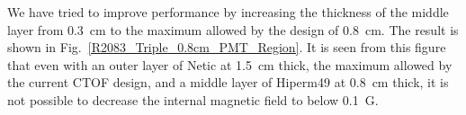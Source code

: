 \documentclass[12pt]{article}
\begin{document}
We have tried to  improve  performance  by increasing the thickness 
of the middle layer  from 0.3~cm to the maximum allowed by the design 
of 0.8~cm. The result is shown in  Fig.~\ref{R2083_Triple_0.8cm_PMT_Region}.  It is seen from this figure 
that even with an outer layer of Netic at 1.5~cm thick,
the maximum allowed by the current CTOF design, and a middle layer 
of Hiperm49 at 0.8~cm thick, it is not possible to decrease the internal
magnetic field to below 0.1~G. 
%
\begin{figure}[ht]
\centering
{}
\qquad
{}
\qquad
{}

\end{figure}
\end{document}
